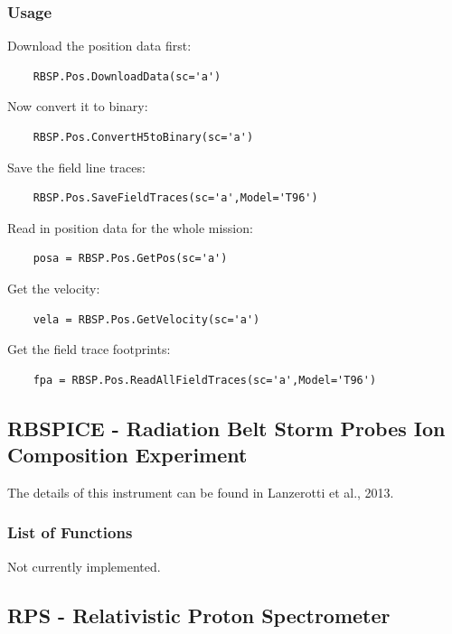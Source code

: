 	\subsubsection{Usage}
	
	Download the position data first:
	
	\begin{verbatim}
	RBSP.Pos.DownloadData(sc='a')
	\end{verbatim}
	
	Now convert it to binary:
	
	\begin{verbatim}
	RBSP.Pos.ConvertH5toBinary(sc='a')
	\end{verbatim}
	
	Save the field line traces:
	
	\begin{verbatim}
	RBSP.Pos.SaveFieldTraces(sc='a',Model='T96')
	\end{verbatim}
	
	Read in position data for the whole mission:
	
	\begin{verbatim}
	posa = RBSP.Pos.GetPos(sc='a')
	\end{verbatim}
	
	Get the velocity:
	
	\begin{verbatim}
	vela = RBSP.Pos.GetVelocity(sc='a')
	\end{verbatim}
	
	Get the field trace footprints:
	
	\begin{verbatim}
	fpa = RBSP.Pos.ReadAllFieldTraces(sc='a',Model='T96')
	\end{verbatim}
	
	\subsection{RBSPICE - Radiation Belt Storm Probes Ion Composition Experiment}
	
	The details of this instrument can be found in Lanzerotti et al., 2013.
	
	\subsubsection{List of Functions}
	
	Not currently implemented.
	
	\subsection{RPS - Relativistic Proton Spectrometer}
	
